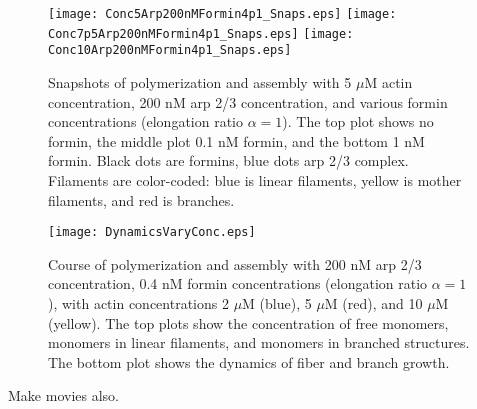 \documentclass[11pt]{article}
\begin{document}
\begin{figure}
\centering
\texttt{[image: Conc5Arp200nMFormin4p1\_Snaps.eps]}
\texttt{[image: Conc7p5Arp200nMFormin4p1\_Snaps.eps]}
\texttt{[image: Conc10Arp200nMFormin4p1\_Snaps.eps]}
\caption{\label{fig:ForminArpsSnaps}Snapshots of polymerization and assembly with 5 $\mu$M actin concentration, 200 nM arp 2/3 concentration, and various formin concentrations (elongation ratio $\alpha=1$). The top plot shows no formin, the middle plot 0.1 nM formin, and the bottom 1 nM formin. Black dots are formins, blue dots arp 2/3 complex. Filaments are color-coded: blue is linear filaments, yellow is mother filaments, and red is branches.}
\end{figure}




\begin{figure}
\centering
\texttt{[image: DynamicsVaryConc.eps]}
\caption{\label{fig:ActinConc}Course of polymerization and assembly with 200 nM arp 2/3 concentration, 0.4 nM formin concentrations (elongation ratio $\alpha=1$), with actin concentrations 2 $\mu$M (blue), 5 $\mu$M (red), and 10 $\mu$M (yellow). The top plots show the concentration of free monomers, monomers in linear filaments, and monomers in branched structures. The bottom plot shows the dynamics of fiber and branch growth. }
\end{figure}
Make movies also.
\end{document}
